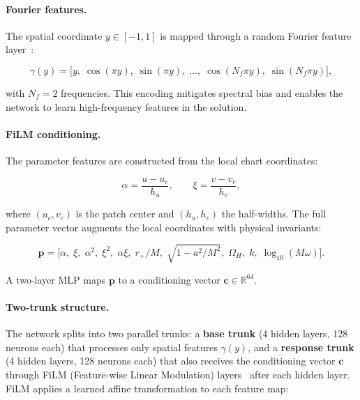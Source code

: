 \documentclass[aps,prd,twocolumn,superscriptaddress,nofootinbib]{revtex4-2}
\begin{document}
\paragraph{Fourier features.}  The spatial coordinate $y \in [-1,1]$ is mapped
through a random Fourier feature layer~\cite{Tancik:2020fourier}:

\begin{equation}
  \gamma(y) = \big[ y,\; \cos(\pi y),\; \sin(\pi y),\;
    \dots,\; \cos(N_f \pi y),\; \sin(N_f \pi y) \big],
\end{equation}

with $N_f = 2$ frequencies.  This encoding mitigates spectral bias and enables
the network to learn high-frequency features in the solution.

\paragraph{FiLM conditioning.}  The parameter features are constructed from the
local chart coordinates:

\begin{equation}
  \alpha = \frac{u - u_c}{h_u},\qquad
  \xi = \frac{v - v_c}{h_v},
\end{equation}

where $(u_c, v_c)$ is the patch center and $(h_u, h_v)$ the half-widths.  The
full parameter vector augments the local coordinates with physical invariants:

\begin{equation}
  \mathbf{p} = \big[ \alpha,\; \xi,\; \alpha^2,\; \xi^2,\; \alpha\xi,\;
    r_+/M,\; \sqrt{1-a^2/M^2},\; \Omega_H,\; k,\; \log_{10}(M\omega) \big].
\end{equation}

A two-layer MLP maps $\mathbf{p}$ to a conditioning vector
$\mathbf{c} \in \mathbb{R}^{64}$.

\paragraph{Two-trunk structure.} The network splits into two parallel trunks:
a \textbf{base trunk} (4 hidden layers, 128 neurons each) that processes only
spatial features $\gamma(y)$, and a \textbf{response trunk} (4 hidden layers,
128 neurons each) that also receives the conditioning vector $\mathbf{c}$
through FiLM (Feature-wise Linear Modulation) layers~\cite{Perez:2018film} after
each hidden layer.  FiLM applies a learned affine transformation to each feature
map:
\end{document}
